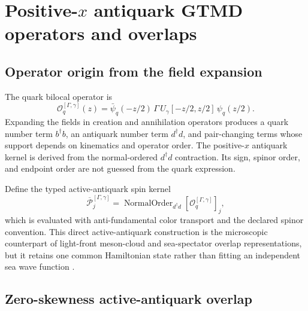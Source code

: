 \documentclass[11pt]{article}
\newcommand{\cO}{\mathcal O}
\newcommand{\cP}{\mathcal P}
\begin{document}
\section{\texorpdfstring{Positive-\(x\)}{Positive-x} antiquark GTMD operators and overlaps}
\label{sec:antiquark}

\subsection{Operator origin from the field expansion}

The quark bilocal operator is
\begin{equation}
 \cO_q^{[\Gamma,\gamma]}(z)
 =
 \bar\psi_q(-z/2)\,
 \Gamma\,U_{\gamma}[-z/2,z/2]\,
 \psi_q(z/2).
 \label{eq:bilocal}
\end{equation}
Expanding the fields in creation and annihilation operators produces a quark
number term \(b^{\dagger}b\), an antiquark number term \(d^{\dagger}d\), and
pair-changing terms whose support depends on kinematics and operator order.
The positive-\(x\) antiquark kernel is derived from the normal-ordered
\(d^{\dagger}d\) contraction.  Its sign, spinor order, and endpoint order are
not guessed from the quark expression.

Define the typed active-antiquark spin kernel
\begin{equation}
 \overline{\cP}_{j}^{[\Gamma,\gamma]}
 =
 \operatorname{NormalOrder}_{d^{\dagger}d}
 \left[
 \cO_q^{[\Gamma,\gamma]}
 \right]_j,
 \label{eq:antiquark-projector}
\end{equation}
which is evaluated with anti-fundamental color transport and the declared
spinor convention.  This direct active-antiquark construction is the
microscopic counterpart of light-front meson-cloud and sea-spectator overlap
representations, but it retains one common Hamiltonian state rather than
fitting an independent sea wave function \cite{KoflerPasquini2017,Choudhary2023}.

\subsection{Zero-skewness active-antiquark overlap}
\end{document}
